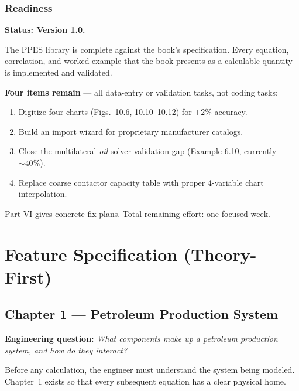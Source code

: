 \documentclass[11pt,a4paper,openany]{book}
\begin{document}
\section{Readiness}

\begin{readinessbox}
\textbf{Status: Version 1.0.}

The PPES library is complete against the book's specification. Every
equation, correlation, and worked example that the book presents as
a calculable quantity is implemented and validated.

\textbf{Four items remain} — all data-entry or validation tasks, not
coding tasks:

\begin{enumerate}
  \item Digitize four charts (Figs.~10.6, 10.10--10.12) for $\pm 2\%$
        accuracy.
  \item Build an import wizard for proprietary manufacturer catalogs.
  \item Close the multilateral \emph{oil} solver validation gap
        (Example 6.10, currently $\sim 40\%$).
  \item Replace coarse contactor capacity table with proper 4-variable
        chart interpolation.
\end{enumerate}

Part VI gives concrete fix plans. Total remaining effort: one focused
week.
\end{readinessbox}

\part{Feature Specification (Theory-First)}

\chapter{Chapter 1 — Petroleum Production System}

\begin{purpose}
\textbf{Engineering question:} \emph{What components make up a
petroleum production system, and how do they interact?}

Before any calculation, the engineer must understand the system being
modeled. Chapter~1 exists so that every subsequent equation has a
clear physical home.
\end{purpose}
\end{document}
